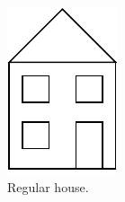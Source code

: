 \documentclass[11pt]{article}
\begin{document}
\begin{figure}
	\centering
	\begin{adjustbox}{minipage=\linewidth,scale=0.8}	
	\begin{subfigure}[b]{0.3\textwidth}
		\includegraphics[width=\textwidth]{straight}
	\caption{Regular house.}
	\label{fig:straight}
	\end{subfigure}
	~
	\begin{subfigure}[b]{0.4\textwidth}

\end{subfigure}
\end{adjustbox}
\end{figure}
\end{document}
